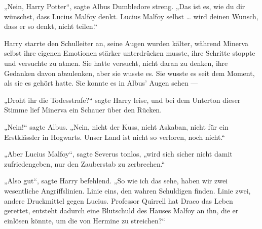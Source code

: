 „Nein, Harry Potter“, sagte Albus Dumbledore streng.
„Das ist es, wie du dir wünschst, dass Lucius Malfoy denkt. Lucius Malfoy selbst … wird deinen Wunsch, dass er so denkt, nicht teilen.“

Harry starrte den Schulleiter an, seine Augen wurden kälter, während Minerva selbst ihre eigenen Emotionen stärker unterdrücken musste, ihre Schritte stoppte und versuchte zu atmen. Sie hatte versucht, nicht daran zu denken, ihre Gedanken davon abzulenken, aber sie wusste es. Sie wusste es seit dem Moment, als sie es gehört hatte. Sie konnte es in Albus’ Augen sehen —

„Droht ihr die Todesstrafe?“ sagte Harry leise, und bei dem Unterton dieser Stimme lief Minerva ein Schauer über den Rücken.

„Nein!“ sagte Albus.
„Nein, nicht der Kuss, nicht Askaban, nicht für ein Erstklässler in Hogwarts. Unser Land ist nicht so verloren, noch nicht.“

„Aber Lucius Malfoy“, sagte Severus tonlos, „wird sich sicher nicht damit zufriedengeben, nur den Zauberstab zu zerbrechen.“

„Also gut“, sagte Harry befehlend.
„So wie ich das sehe, haben wir zwei wesentliche Angriffslinien. Linie eins, den wahren Schuldigen finden. Linie zwei, andere Druckmittel gegen Lucius. Professor Quirrell hat Draco das Leben gerettet, entsteht dadurch eine Blutschuld des Hauses Malfoy an ihn, die er einlösen könnte, um die von Hermine zu streichen?“

